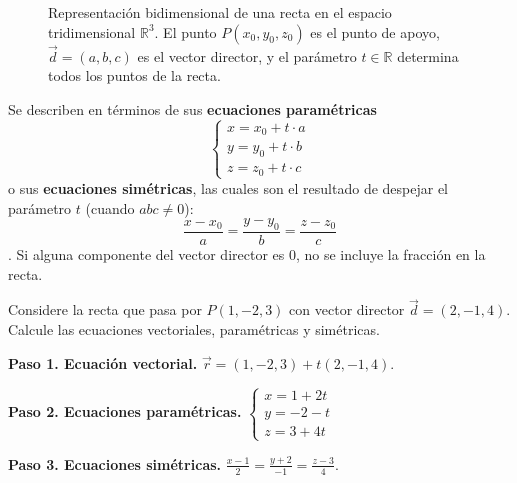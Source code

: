 \begin{definition}
\begin{figure}[!htbp]
\caption{Representación bidimensional de una recta en el espacio tridimensional $\mathbb{R}^3$. El punto $P(x_0,y_0,z_0)$ es el punto de apoyo, $\vec{d}=(a,b,c)$ es el vector director, y el parámetro $t \in \mathbb{R}$ determina todos los puntos de la recta.}
\label{fig:rectaespacio}
\end{figure}

Se describen en términos de sus \textbf{ecuaciones paramétricas} \[
\begin{cases}
x = x_0 + t \cdot a \\
y = y_0 + t \cdot b \\
z = z_0 + t \cdot c
\end{cases}
\] o sus \textbf{ecuaciones simétricas}, las cuales son el resultado de despejar el parámetro $t$ (cuando $abc \neq 0$):
\[\frac{x - x_0}{a} = \frac{y - y_0}{b} = \frac{z - z_0}{c}\]. Si alguna componente del vector director es 0, no se incluye la fracción en la recta.
\end{definition}

\begin{example}
Considere la recta que pasa por $P(1, -2, 3)$ con vector director $\vec{d} = (2, -1, 4).$ Calcule las ecuaciones vectoriales, paramétricas y simétricas. 
\begin{myproof}
\textbf{Paso 1. Ecuación vectorial.} \(\vec{r} = (1, -2, 3) + t(2, -1, 4)\).

\textbf{Paso 2. Ecuaciones paramétricas.} \(
\begin{cases}
x = 1 + 2t \\
y = -2 - t \\
z = 3 + 4t
\end{cases}
\)

\textbf{Paso 3. Ecuaciones simétricas.} \( \boxed{\frac{x - 1}{2} = \frac{y + 2}{-1} = \frac{z - 3}{4}}
\).
\end{myproof}


\end{example}


